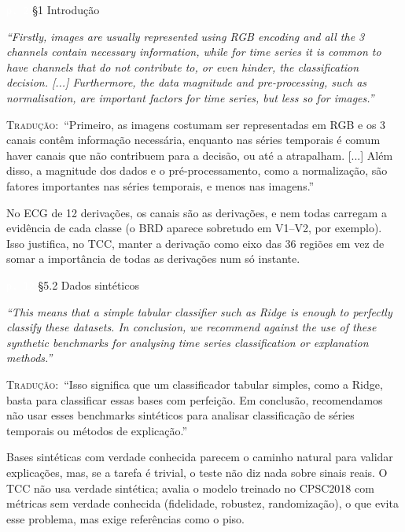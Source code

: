 \documentclass[11pt,a4paper]{article}
\newcommand{\pagechip}[1]{{\setlength{\fboxsep}{1.5pt}\colorbox{cAcc}{\textcolor{white}{\scriptsize\texttt{#1}}}}}
\newenvironment{origquote}{\par\itshape\small}{\par}
\newenvironment{tradquote}{\par\small\textsc{Tradução:}\ }{\par}
\newcommand{\explab}[1]{\par\smallskip{\small\color{cAcc}\textbf{\MakeUppercase{#1}}}\par}
\begin{document}
\begin{citacard}{\pagechip{p. 2} §1 Introdução}
\begin{origquote}“Firstly, images are usually represented using RGB encoding and all the 3 channels contain necessary information, while for time series it is common to have channels that do not contribute to, or even hinder, the classification decision. [...] Furthermore, the data magnitude and pre-processing, such as normalisation, are important factors for time series, but less so for images.”\end{origquote}
\begin{tradquote}“Primeiro, as imagens costumam ser representadas em RGB e os 3 canais contêm informação necessária, enquanto nas séries temporais é comum haver canais que não contribuem para a decisão, ou até a atrapalham. [...] Além disso, a magnitude dos dados e o pré-processamento, como a normalização, são fatores importantes nas séries temporais, e menos nas imagens.”\end{tradquote}
\explab{Explicação}
No ECG de 12 derivações, os canais são as derivações, e nem todas carregam a evidência de cada classe (o BRD aparece sobretudo em V1--V2, por exemplo). Isso justifica, no TCC, manter a derivação como eixo das 36 regiões em vez de somar a importância de todas as derivações num só instante.
\end{citacard}

\begin{citacard}{\pagechip{p. 12} §5.2 Dados sintéticos}
\begin{origquote}“This means that a simple tabular classifier such as Ridge is enough to perfectly classify these datasets. In conclusion, we recommend against the use of these synthetic benchmarks for analysing time series classification or explanation methods.”\end{origquote}
\begin{tradquote}“Isso significa que um classificador tabular simples, como a Ridge, basta para classificar essas bases com perfeição. Em conclusão, recomendamos não usar esses benchmarks sintéticos para analisar classificação de séries temporais ou métodos de explicação.”\end{tradquote}
\explab{Explicação}
Bases sintéticas com verdade conhecida parecem o caminho natural para validar explicações, mas, se a tarefa é trivial, o teste não diz nada sobre sinais reais. O TCC não usa verdade sintética; avalia o modelo treinado no CPSC2018 com métricas sem verdade conhecida (fidelidade, robustez, randomização), o que evita esse problema, mas exige referências como o piso.
\end{citacard}
\end{document}
